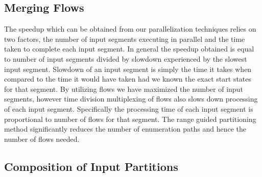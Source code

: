 \subsection{Merging Flows}
The speedup which can be obtained from our parallelization techniques relies on two factors, the number of input segments executing
in parallel and the time taken to complete each input segment. In
general the speedup obtained is equal to number of input segments
divided by slowdown experienced by the slowest input segment.
Slowdown of an input segment is simply the time it takes when
compared to the time it would have taken had we known the exact
start states for that segment.
By utilizing flows we have maximized the number of input segments, however time division multiplexing of flows also slows down
processing of each input segment. Specifically the processing time
of each input segment is proportional to number of flows for that
segment. The range guided partitioning method significantly reduces
the number of enumeration paths and hence the number of flows
needed.

\subsection{Composition of Input Partitions}
